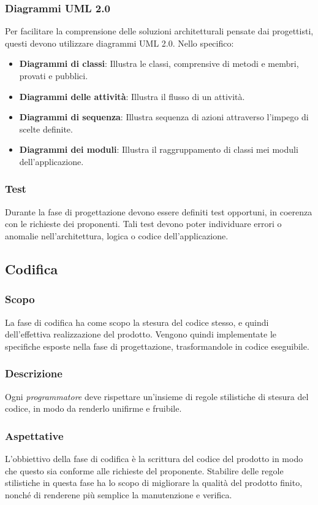 \subsubsection{Diagrammi UML 2.0}
Per facilitare la comprensione delle soluzioni architetturali pensate dai progettisti, questi devono utilizzare diagrammi UML 2.0.
Nello specifico:
\begin{itemize}
    \item \textbf{Diagrammi di classi}: Illustra le classi, comprensive di metodi e membri, provati e pubblici.
    \item \textbf{Diagrammi delle attività}: Illustra il flusso di un attività.
    \item \textbf{Diagrammi di sequenza}: Illustra sequenza di azioni attraverso l'impego di scelte definite.
    \item \textbf{Diagrammi dei moduli}: Illustra il raggruppamento di classi mei moduli dell'applicazione.
\end{itemize}
\subsubsection{Test}
Durante la fase di progettazione devono essere definiti test opportuni, in coerenza con le richieste dei proponenti.
Tali test devono poter individuare errori o anomalie nell'architettura, logica o codice dell'applicazione.

\subsection{Codifica}
\subsubsection{Scopo}
La fase di codifica ha come scopo la stesura del codice stesso, e quindi dell'effettiva realizzazione del prodotto.
Vengono quindi implementate le specifiche esposte nella fase di progettazione, trasformandole in codice eseguibile.
\subsubsection{Descrizione}
Ogni \textit{programmatore} deve rispettare un'insieme di regole stilistiche di stesura del codice, in modo da renderlo unifirme e fruibile.
\subsubsection{Aspettative}
L'obbiettivo della fase di codifica è la scrittura del codice del prodotto in modo che questo sia conforme alle richieste del proponente.
Stabilire delle regole stilistiche in questa fase ha lo scopo di migliorare la qualità del prodotto finito, nonché di renderene più semplice la manutenzione e verifica.
